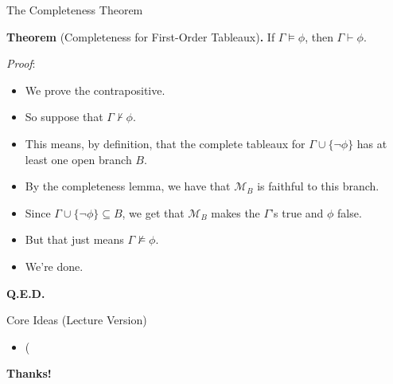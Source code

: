 \begin{frame}{The Completeness Theorem}

  \textbf{Theorem} (Completeness for First-Order Tableaux)\textbf{.}
  If $\Gamma\vDash\phi$, then $\Gamma\vdash\phi$.

  \emph{Proof}:

  \begin{itemize}
  \item We prove the contrapositive.

  \item So suppose that $\Gamma\nvdash\phi$.

    \item This means, by definition, that the complete tableaux for
      $\Gamma\cup\{\neg\phi\}$ has at least one open branch $B$.

      \item By the completeness lemma, we have that $\mathcal{M}_B$ is
        faithful to this branch.

        \item Since $\Gamma\cup\{\neg\phi\}\subseteq B$, we get that
          $\mathcal{M}_B$ makes the $\Gamma$'s true and $\phi$ false.

        \item But that just means $\Gamma\nvDash\phi$.

          \item We're done.
  \end{itemize}

\end{frame}

\begin{frame}

  \vfill

  \begin{center}
  {\Large \textbf{Q.E.D.}}
\end{center}
  
\end{frame}


\begin{frame}{Core Ideas (Lecture Version)}

  \begin{itemize}

  \item (
    
  \end{itemize}

\end{frame}

\begin{frame}

	\begin{center}
	{\huge\bf Thanks!}
	\end{center}

\end{frame}
